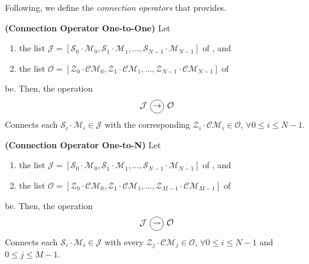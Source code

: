 
Following, we define the \textit{connection operators} that \posl{} provides.

\begin{definition}\label{op_conn:1to1}
{\bf (Connection Operator One-to-One)} Let 
\begin{enumerate}
\item the list $\mathcal{J} = \left[\mathcal{S}_0\cdot \mathcal{M}_0, \mathcal{S}_1\cdot \mathcal{M}_1, ..., \mathcal{S}_{N-1}\cdot \mathcal{M}_{N-1}\right]$ of \jacks, and
\item the list $\mathcal{O} = \left[\mathcal{Z}_0\cdot \mathcal{CM}_0, \mathcal{Z}_1\cdot \mathcal{CM}_1, ..., \mathcal{Z}_{N-1}\cdot \mathcal{CM}_{N-1}\right]$ of \outlets{}
\end{enumerate} be. Then, the operation 
\[
\mathcal{J} \poslop{\rightarrow} \mathcal{O}
\]
Connects each \jack{} $\mathcal{S}_i\cdot \mathcal{M}_i \in \mathcal{J}$ with the corresponding \outlet{} $\mathcal{Z}_i\cdot \mathcal{CM}_i \in \mathcal{O}$, $\forall 0 \leq i \leq N-1$.
\end{definition}

\begin{definition}\label{op_conn:1ton}
{\bf (Connection Operator One-to-N)} Let 
\begin{enumerate} 
\item the list $\mathcal{J} = \left[\mathcal{S}_0\cdot \mathcal{M}_0, \mathcal{S}_1\cdot \mathcal{M}_1, ..., \mathcal{S}_{N-1}\cdot \mathcal{M}_{N-1}\right]$ of \jacks, and 
\item the list $\mathcal{O} = \left[\mathcal{Z}_0\cdot \mathcal{CM}_0, \mathcal{Z}_1\cdot \mathcal{CM}_1, ..., \mathcal{Z}_{M-1}\cdot \mathcal{CM}_{M-1}\right]$ of \outlets{} 
\end{enumerate} be. Then, the operation 
\[
\mathcal{J} \poslop{\rightsquigarrow} \mathcal{O}
\]
Connects each \jack{} $\mathcal{S}_i\cdot \mathcal{M}_i \in \mathcal{J}$ with every \outlet{} $\mathcal{Z}_j\cdot \mathcal{CM}_j \in \mathcal{O}$, $\forall 0 \leq i \leq N-1$ and $0 \leq j \leq M-1$.
\end{definition}

